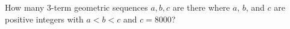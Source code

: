 How many $3$-term geometric sequences $a,b,c$ are there where $a$, $b$, and $c$ are positive integers with $a<b<c$ and $c=8000$?